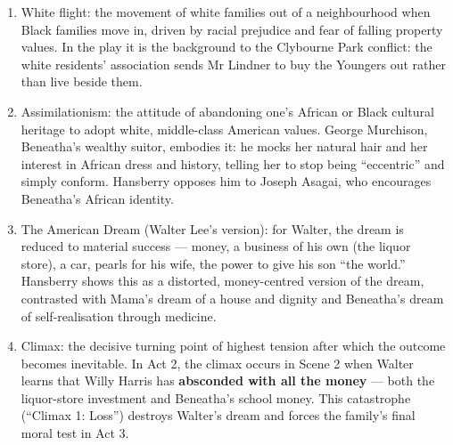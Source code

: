 \documentclass[11pt]{article}
\newcommand{\cle}[1]{{\popxbold\color{popdark}#1}}
\begin{document}
\begin{corrige}
\begin{enumerate}
\item \cle{White flight}: the movement of white families out of a neighbourhood when Black families move in, driven by racial prejudice and fear of falling property values. In the play it is the background to the Clybourne Park conflict: the white residents' association sends Mr Lindner to buy the Youngers out rather than live beside them.
\item \cle{Assimilationism}: the attitude of abandoning one's African or Black cultural heritage to adopt white, middle-class American values. George Murchison, Beneatha's wealthy suitor, embodies it: he mocks her natural hair and her interest in African dress and history, telling her to stop being ``eccentric'' and simply conform. Hansberry opposes him to Joseph Asagai, who encourages Beneatha's African identity.
\item \cle{The American Dream} (Walter Lee's version): for Walter, the dream is reduced to \cle{material success} --- money, a business of his own (the liquor store), a car, pearls for his wife, the power to give his son ``the world.'' Hansberry shows this as a distorted, money-centred version of the dream, contrasted with Mama's dream of a house and dignity and Beneatha's dream of self-realisation through medicine.
\item \cle{Climax}: the decisive turning point of highest tension after which the outcome becomes inevitable. In Act 2, the climax occurs in Scene 2 when Walter learns that Willy Harris has \textbf{absconded with all the money} --- both the liquor-store investment and Beneatha's school money. This catastrophe (``Climax 1: Loss'') destroys Walter's dream and forces the family's final moral test in Act 3.
\end{enumerate}
\end{corrige}
\end{document}
